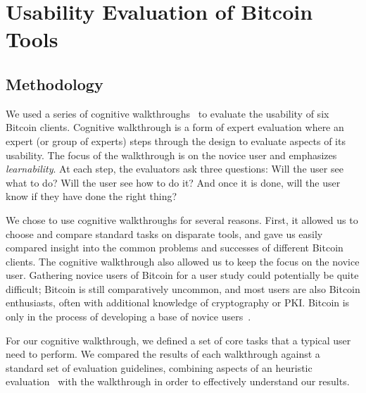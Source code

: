 
\section{Usability Evaluation of Bitcoin Tools}

\subsection{Methodology}

We used a series of cognitive walkthroughs~\cite{WRLP94} to evaluate the usability of six Bitcoin clients. Cognitive walkthrough is a form of expert evaluation where an expert (or group of experts) steps through the design to evaluate aspects of its usability. The focus of the walkthrough is on the novice user and emphasizes \emph{learnability}. At each step, the evaluators ask three questions: Will the user see what to do? Will the user see how to do it? And once it is done, will the user know if they have done the right thing?

We chose to use cognitive walkthroughs for several reasons. First, it allowed us to choose and compare standard tasks on disparate tools, and gave us easily compared insight into the common problems and successes of different Bitcoin clients. The cognitive walkthrough also allowed us to keep the focus on the novice user. Gathering novice users of Bitcoin for a user study could potentially be quite difficult; Bitcoin is still comparatively uncommon, and most users are also Bitcoin enthusiasts, often with additional knowledge of cryptography or PKI. Bitcoin is only in the process of developing a base of novice users~\cite{WhatToCite??}. %


For our cognitive walkthrough, we defined a set of core tasks that a typical user need to perform. We compared the results of each walkthrough against a standard set of evaluation guidelines, combining aspects of an heuristic evaluation~\cite{HeuristicEvaluation} with the walkthrough in order to effectively understand our results. 

